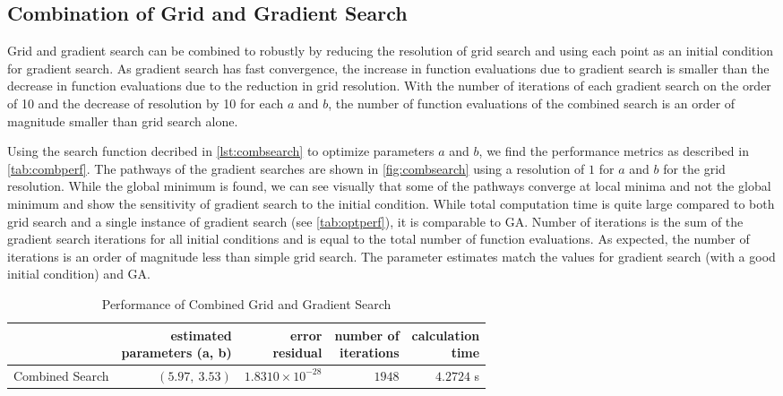 \documentclass[11pt,a4paper]{article}
\begin{document}
\subsection{Combination of Grid and Gradient Search}
Grid and gradient search can be combined to robustly by reducing the resolution
of grid search and using each point as an initial condition for gradient
search. As gradient search has fast convergence, the increase in function
evaluations due to gradient search is smaller than the decrease in function
evaluations due to the reduction in grid resolution. With the number of
iterations of each gradient search on the order of 10 and the decrease of
resolution by 10 for each $a$ and $b$, the number of function evaluations of
the combined search is an order of magnitude smaller than grid search alone.

Using the search function decribed in \autoref{lst:combsearch} to optimize
parameters $a$ and $b$, we find the performance metrics as described in
\autoref{tab:combperf}. The pathways of the gradient searches are shown in
\autoref{fig:combsearch} using a resolution of $1$ for $a$ and $b$ for the grid
resolution. While the global minimum is found, we can see visually that some of
the pathways converge at local minima and not the global minimum and show the
sensitivity of gradient search to the initial condition. While total
computation time is quite large compared to both grid search and a single
instance of gradient search (see \autoref{tab:optperf}), it is comparable to
GA. Number of iterations is the sum of the gradient search iterations for all
initial conditions and is equal to the total number of function evaluations. As
expected, the number of iterations is an order of magnitude less than simple
grid search. The parameter estimates match the values for gradient search (with
a good initial condition) and GA.

\begin{table}
    \centering
    \begin{tabular}{|l|r|r|r|r|}
        \hline
        \nonumber & \shortstack[c]{estimated\\parameters (a, b)} &
            \shortstack[c]{error\\residual} &
            \shortstack[c]{number of\\iterations} &
            \shortstack[c]{calculation\\time} \\
        \hline
        Combined Search & $ (5.97,\: 3.53) $ & $ 1.8310 \times 10^{-28} $ &
            $ 1948 $ & $ 4.2724 $ s \\
        \hline
    \end{tabular}
    \caption{Performance of Combined Grid and Gradient Search}
    \label{tab:combperf}
\end{table}
\end{document}
